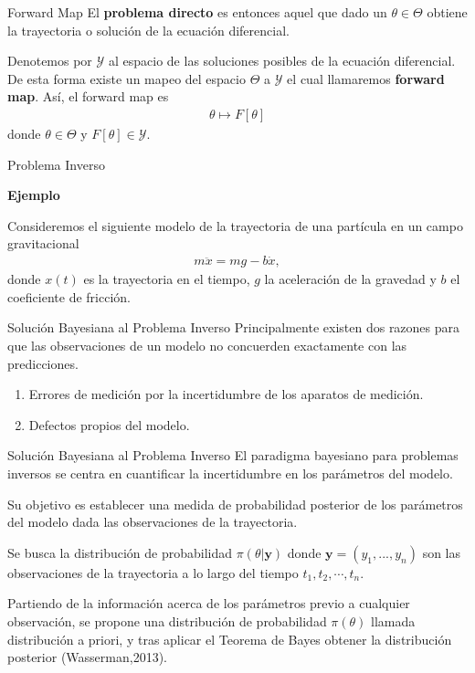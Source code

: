 \documentclass[10pt,aspectratio=169]{beamer}
\begin{document}
\begin{frame}{Forward Map}
  El \textbf{problema directo} es entonces aquel que dado un $\theta \in \Theta$ obtiene la trayectoria o solución de la ecuación diferencial.

  \vspace{1 cm}
  
  Denotemos por $\mathcal{Y}$ al espacio de las soluciones posibles de la ecuación diferencial. De esta forma existe un mapeo del espacio $\Theta$ a $\mathcal{Y}$ el cual llamaremos \textbf{forward map}. Así, el forward map es 
  \begin{align*}
      \theta \mapsto F[\theta]
  \end{align*}
  donde $\theta \in \Theta$ y $F[\theta] \in \mathcal{Y}$.
\end{frame}

\begin{frame}{Problema Inverso}

  \textbf{Ejemplo}

  \vspace{0.5 cm}

  Consideremos el siguiente modelo de la trayectoria de una partícula en un campo gravitacional
  \begin{align}
    m \ddot{x} = mg - b\dot{x},
    \label{3.1.03}
  \end{align}
  donde $x(t)$ es la trayectoria en el tiempo, $g$ la aceleración de la gravedad y $b$ el coeficiente de fricción.
  
\end{frame}

\begin{frame}{Solución Bayesiana al Problema Inverso}
  Principalmente existen dos razones para que las observaciones de un modelo no concuerden exactamente con las predicciones.

  \begin{enumerate}
    \item Errores de medición por la incertidumbre de los aparatos de medición.
    \item Defectos propios del modelo.
  \end{enumerate}
\end{frame}

\begin{frame}{Solución Bayesiana al Problema Inverso}
  El paradigma bayesiano para problemas inversos se centra en cuantificar la incertidumbre en los parámetros del modelo.
  
  Su objetivo es establecer una medida de probabilidad posterior de los parámetros del modelo dada las observaciones de la trayectoria. 
  
  Se busca la distribución de probabilidad $\pi(\theta|\mathbf{y})$ donde $\mathbf{y} = (y_1,...,y_n)$ son las observaciones de la trayectoria a lo largo del tiempo $t_1, t_2, \cdots, t_n$. 
  
  Partiendo de la información acerca de los parámetros previo a cualquier observación, se propone una distribución de probabilidad $\pi(\theta)$ llamada distribución a priori, y tras aplicar el Teorema de Bayes obtener la distribución posterior (Wasserman,2013).
\end{frame}
\end{document}
